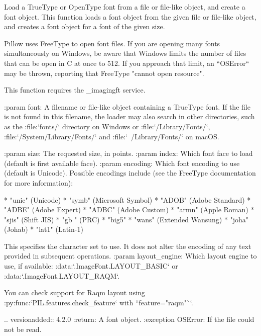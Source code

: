 \begin{DoxyVerb}Load a TrueType or OpenType font from a file or file-like object,
and create a font object.
This function loads a font object from the given file or file-like
object, and creates a font object for a font of the given size.

Pillow uses FreeType to open font files. If you are opening many fonts
simultaneously on Windows, be aware that Windows limits the number of files
that can be open in C at once to 512. If you approach that limit, an
``OSError`` may be thrown, reporting that FreeType "cannot open resource".

This function requires the _imagingft service.

:param font: A filename or file-like object containing a TrueType font.
             If the file is not found in this filename, the loader may also
             search in other directories, such as the :file:`fonts/`
             directory on Windows or :file:`/Library/Fonts/`,
             :file:`/System/Library/Fonts/` and :file:`~/Library/Fonts/` on
             macOS.

:param size: The requested size, in points.
:param index: Which font face to load (default is first available face).
:param encoding: Which font encoding to use (default is Unicode). Possible
                 encodings include (see the FreeType documentation for more
                 information):

                 * "unic" (Unicode)
                 * "symb" (Microsoft Symbol)
                 * "ADOB" (Adobe Standard)
                 * "ADBE" (Adobe Expert)
                 * "ADBC" (Adobe Custom)
                 * "armn" (Apple Roman)
                 * "sjis" (Shift JIS)
                 * "gb  " (PRC)
                 * "big5"
                 * "wans" (Extended Wansung)
                 * "joha" (Johab)
                 * "lat1" (Latin-1)

                 This specifies the character set to use. It does not alter the
                 encoding of any text provided in subsequent operations.
:param layout_engine: Which layout engine to use, if available:
                 :data:`.ImageFont.LAYOUT_BASIC` or :data:`.ImageFont.LAYOUT_RAQM`.

                 You can check support for Raqm layout using
                 :py:func:`PIL.features.check_feature` with ``feature="raqm"``.

                 .. versionadded:: 4.2.0
:return: A font object.
:exception OSError: If the file could not be read.
\end{DoxyVerb}
 

